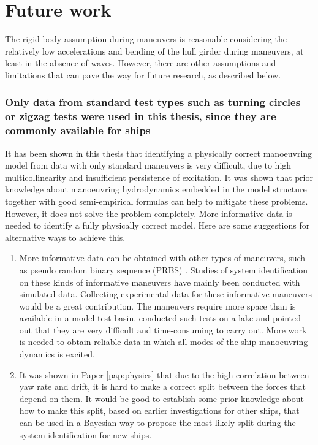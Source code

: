 \chapter{Future work\label{ch:future_work}}

\noindent The rigid body assumption during maneuvers is reasonable considering the relatively low accelerations and bending of the hull girder during maneuvers, at least in the absence of waves. However, there are other assumptions and limitations that can pave the way for future research, as described below.

\subsection*{Only data from standard test types such as turning circles or zigzag tests were used in this thesis, since they are commonly available for ships}
It has been shown in this thesis that identifying a physically correct manoeuvring model from data with only standard maneuvers is very difficult, due to high multicollinearity and insufficient persistence of excitation. 
It was shown that prior knowledge about manoeuvring hydrodynamics embedded in the model structure together with good semi-empirical formulas can help to mitigate these problems.
However, it does not solve the problem completely. More informative data is needed to identify a fully physically correct model. Here are some suggestions for alternative ways to achieve this.
\begin{enumerate}[label=(\roman*),itemsep=1mm]
    
    \item More informative data can be obtained with other types of maneuvers, such as pseudo random binary sequence (PRBS) \cite{yoonIdentificationHydrodynamicCoefficients2003,wangOptimalDesignExcitation2020}. Studies of system identification on these kinds of informative maneuvers have mainly been conducted with simulated data. Collecting experimental data for these informative maneuvers would be a great contribution. The maneuvers require more space than is available in a model test basin. \textcite{millerShipModelIdentification2021} conducted such tests on a lake and pointed out that they are very difficult and time-consuming to carry out. More work is needed to obtain reliable data in which all modes of the ship manoeuvring dynamics is excited.
    
    \item It was shown in Paper \ref{pap:physics} that due to the high correlation between yaw rate and drift, it is hard to make a correct split between the forces that depend on them. It would be good to establish some prior knowledge about how to make this split, based on earlier investigations for other ships, that can be used in a Bayesian way to propose the most likely split during the system identification for new ships.  
        
\end{enumerate}


